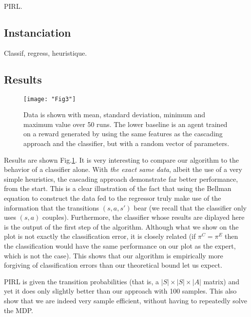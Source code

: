 \documentclass[11pt]{article}
\begin{document}
PIRL.
\subsection{Instanciation}
Classif, regress, heuristique.
\subsection{Results}
\begin{figure}
  \texttt{[image: "Fig3"]}
  \caption{Data is shown with mean, standard deviation, minimum and maximum value over 50 runs. The lower baseline is an agent trained on a reward generated by using the same features as the cascading approach and the classifier, but with a random vector of parameters.}
  \label{fig:Highway cascading}
\end{figure}

Results are shown Fig.\ref{fig:Highway cascading}. It is very interesting to compare our algorithm to the behavior of a classifier alone. With \emph{the exact same data}, albeit the use of a very simple heuristics, the cascading approach demonstrate far better performance, from the start. This is a clear illustration of the fact that using the Bellman equation to construct the data fed to the regressor truly make use of the information that the transitions $(s,a,s')$ bear (we recall that the classifier only uses $(s,a)$ couples). Furthermore, the classifier whose results are diplayed here is the output of the first step of the algorithm. Although what we show on the plot is not exactly the classification error, it is closely related (if $\pi^C=\pi^E$ then the classification would have the same performance on our plot as the expert, which is not the case). This shows that our algorithm is empirically more forgiving of classification errors than our theoretical bound let us expect.

PIRL is given the transition probabilities (that is, a $|S|\times |S|\times |A|$ matrix) and yet it does only slightly better than our approach with 100 samples. This also show that we are indeed very sample efficient, without having to repeatedly solve the MDP.
\end{document}
